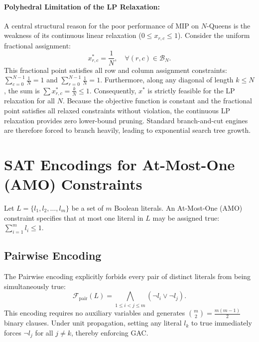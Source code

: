 \documentclass[a4paper,fleqn]{cas-sc}
\begin{document}
\paragraph{Polyhedral Limitation of the LP Relaxation:}
A central structural reason for the poor performance of MIP on $N$-Queens is the weakness of its continuous linear relaxation ($0 \le x_{r, c} \le 1$). Consider the uniform fractional assignment:
\begin{equation}
    x_{r, c}^* = \frac{1}{N}, \quad \forall (r, c) \in \mathcal{B}_N.
\end{equation}
This fractional point satisfies all row and column assignment constraints: $\sum_{c=0}^{N-1} \frac{1}{N} = 1$ and $\sum_{r=0}^{N-1} \frac{1}{N} = 1$. Furthermore, along any diagonal of length $k \le N$, the sum is $\sum x_{r, c}^* = \frac{k}{N} \le 1$. Consequently, $x^*$ is strictly feasible for the LP relaxation for all $N$. Because the objective function is constant and the fractional point satisfies all relaxed constraints without violation, the continuous LP relaxation provides zero lower-bound pruning. Standard branch-and-cut engines are therefore forced to branch heavily, leading to exponential search tree growth.

\section{SAT Encodings for At-Most-One (AMO) Constraints}
\label{sec:encodings}

Let $L = \{l_1, l_2, \dots, l_m\}$ be a set of $m$ Boolean literals. An At-Most-One (AMO) constraint specifies that at most one literal in $L$ may be assigned true: $\sum_{i=1}^m l_i \le 1$.

\subsection{Pairwise Encoding}
The Pairwise encoding explicitly forbids every pair of distinct literals from being simultaneously true:
\begin{equation}
    \mathcal{F}_{\text{pair}}(L) = \bigwedge_{1 \le i < j \le m} (\neg l_i \lor \neg l_j).
\end{equation}
This encoding requires no auxiliary variables and generates $\binom{m}{2} = \frac{m(m-1)}{2}$ binary clauses. Under unit propagation, setting any literal $l_k$ to true immediately forces $\neg l_j$ for all $j \ne k$, thereby enforcing GAC.
\end{document}

